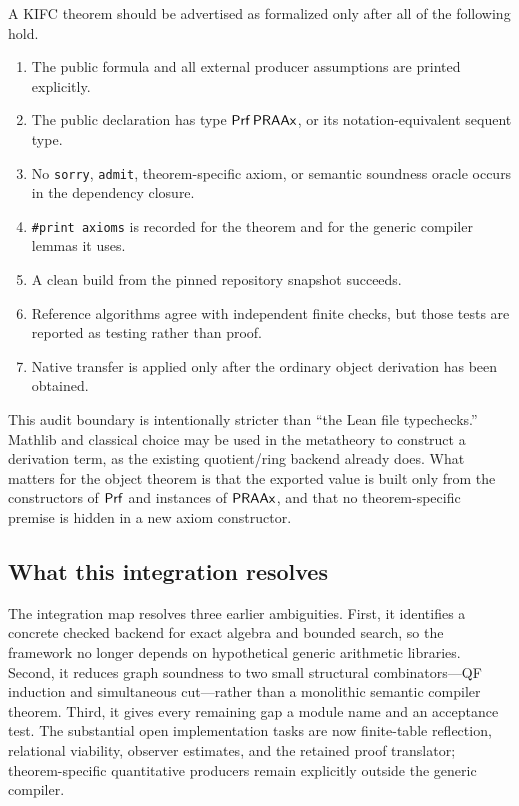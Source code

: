 A KIFC theorem should be advertised as formalized only after all of the following hold.

\begin{enumerate}[label=(\alph*)]
\item The public formula and all external producer assumptions are printed explicitly.
\item The public declaration has type \(\mathsf{Prf}\,\mathsf{PRAAx}\), or its notation-equivalent sequent type.
\item No \texttt{sorry}, \texttt{admit}, theorem-specific axiom, or semantic soundness oracle occurs in the dependency closure.
\item \texttt{\#print axioms} is recorded for the theorem and for the generic compiler lemmas it uses.
\item A clean build from the pinned repository snapshot succeeds.
\item Reference algorithms agree with independent finite checks, but those tests are reported as testing rather than proof.
\item Native transfer is applied only after the ordinary object derivation has been obtained.
\end{enumerate}

This audit boundary is intentionally stricter than ``the Lean file typechecks.''  Mathlib and classical choice may be used in the metatheory to construct a derivation term, as the existing quotient/ring backend already does.  What matters for the object theorem is that the exported value is built only from the constructors of \(\mathsf{Prf}\) and instances of \(\mathsf{PRAAx}\), and that no theorem-specific premise is hidden in a new axiom constructor.

\subsection{What this integration resolves}

The integration map resolves three earlier ambiguities.  First, it identifies a concrete checked backend for exact algebra and bounded search, so the framework no longer depends on hypothetical generic arithmetic libraries.  Second, it reduces graph soundness to two small structural combinators---QF induction and simultaneous cut---rather than a monolithic semantic compiler theorem.  Third, it gives every remaining gap a module name and an acceptance test.  The substantial open implementation tasks are now finite-table reflection, relational viability, observer estimates, and the retained proof translator; theorem-specific quantitative producers remain explicitly outside the generic compiler.
